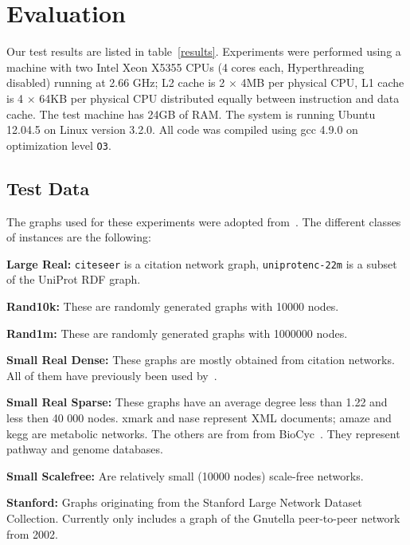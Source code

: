 \documentclass[12pt,a4paper,twoside]{article}
\begin{document}
\section{Evaluation}

Our test results are listed in table~\ref{results}. Experiments were performed using a machine with two Intel Xeon X5355 CPUs (4 cores each, Hyperthreading disabled) running at 2.66 GHz; L2 cache is 2 $\times$ 4MB per physical CPU, L1 cache is 4 $\times$ 64KB per physical CPU distributed equally between instruction and data cache. The test machine has 24GB of RAM.
The system is running Ubuntu 12.04.5 on Linux version 3.2.0. All code was compiled using gcc 4.9.0 on optimization level \texttt{O3}.

\subsection{Test Data}

The graphs used for these experiments were adopted from~\cite{preach}. The different classes of instances are the following:
\begin{description}
  \item{\textbf{Large Real:}} \verb|citeseer| is a citation network graph, \verb|uniprotenc-22m| is a subset of the UniProt RDF graph.
  \item{\textbf{Rand10k:}} These are randomly generated graphs with 10000 nodes.
  \item{\textbf{Rand1m:}} These are randomly generated graphs with 1000000 nodes.
  \item{\textbf{Small Real Dense:}} These graphs are mostly obtained from citation networks. All of them have previously been used by~\cite{Jin:2009:HIS:1559845.1559930}.
  \item{\textbf{Small Real Sparse:}} These graphs have an average degree less than 1.22 and less then
    40 000 nodes. xmark and nase represent XML documents; amaze and kegg are metabolic
    networks. The others are from from BioCyc~\cite{grail}. They represent pathway and genome
    databases.
  \item{\textbf{Small Scalefree:}} Are relatively small (10000 nodes) scale-free networks.
  \item{\textbf{Stanford:}} Graphs originating from the Stanford Large Network Dataset Collection. Currently only includes a graph of the Gnutella peer-to-peer network from 2002.
\end{description}
\end{document}
